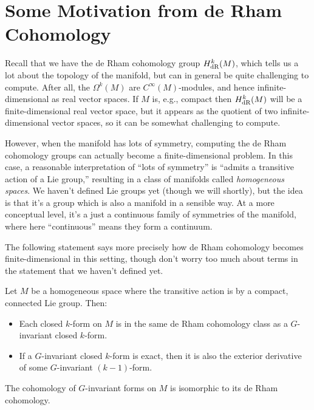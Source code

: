 
\section{Some Motivation from de Rham Cohomology}
\label{sec:Lie group motivation}

Recall that we have the de Rham cohomology group $H_{\text{dR}}^k(M)$, which tells us a lot about the topology of the manifold, but can in general be quite challenging to compute. After all, the $\Omega^k(M)$ are $C^\infty(M)$-modules, and hence infinite-dimensional as real vector spaces. If $M$ is, e.g., compact then $H_{\text{dR}}^k(M)$ will be a finite-dimensional real vector space, but it appears as the quotient of two infinite-dimensional vector spaces, so it can be somewhat challenging to compute.

However, when the manifold has lots of symmetry, computing the de Rham cohomology groups can actually become a finite-dimensional problem. In this case, a reasonable interpretation of ``lots of symmetry'' is ``admits a transitive action of a Lie group,'' resulting in a class of manifolds called \emph{homogeneous spaces}. We haven't defined Lie groups yet (though we will shortly), but the idea is that it's a group which is also a manifold in a sensible way. At a more conceptual level, it's a just a continuous family of symmetries of the manifold, where here ``continuous'' means they form a continuum.

The following statement says more precisely how de Rham cohomology becomes finite-dimensional in this setting, though don't worry too much about terms in the statement that we haven't defined yet.

\begin{theorem}\label{thm:de Rham for homogeneous}
	Let $M$ be a homogeneous space where the transitive action is by a compact, connected Lie group.  Then:
	\begin{itemize}
		\item Each closed $k$-form on $M$ is in the same de Rham cohomology class as a $G$-invariant closed $k$-form.
		\item If a $G$-invariant closed $k$-form is exact, then it is also the exterior derivative of some $G$-invariant $(k-1)$-form.
	\end{itemize}
\end{theorem}

\begin{corollary}\label{cor:invariant de Rham}
	The cohomology of $G$-invariant forms on $M$ is isomorphic to its de Rham cohomology.
\end{corollary}

